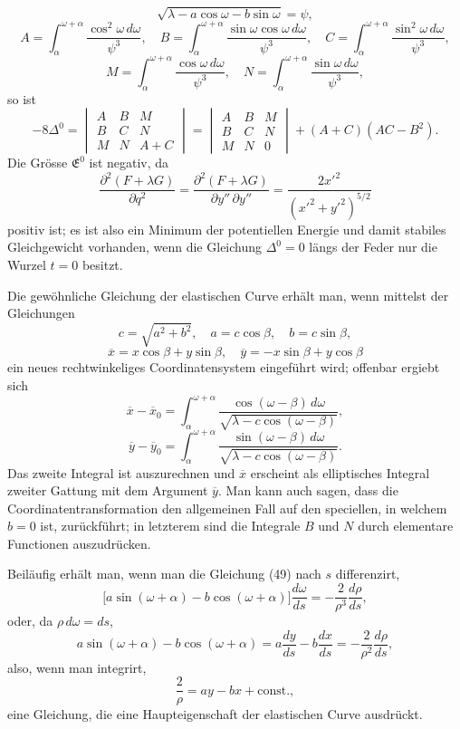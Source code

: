 \documentclass[11pt,a4paper,leqno]{article}
\begin{document}
\[
\sqrt{\lambda-a\cos\omega-b\sin\omega}=\psi,
\]
\[
A=\int_\alpha^{\omega+\alpha}\frac{\cos^2\omega\,d\omega}{\psi^3},\quad
B=\int_\alpha^{\omega+\alpha}\frac{\sin\omega\cos\omega\,d\omega}{\psi^3},\quad
C=\int_\alpha^{\omega+\alpha}\frac{\sin^2\omega\,d\omega}{\psi^3},
\]
\[
M=\int_\alpha^{\omega+\alpha}\frac{\cos\omega\,d\omega}{\psi^3},\quad
N=\int_\alpha^{\omega+\alpha}\frac{\sin\omega\,d\omega}{\psi^3},
\]
so ist
\[
-8\Delta^0=
\begin{vmatrix}
A&B&M\\
B&C&N\\
M&N&A+C
\end{vmatrix}
=
\begin{vmatrix}
A&B&M\\
B&C&N\\
M&N&0
\end{vmatrix}
+(A+C)(AC-B^2).
\]
Die Grösse $\mathfrak{E}^0$ ist negativ, da
\[
\frac{\partial^2(F+\lambda G)}{\partial q^2}
=\frac{\partial^2(F+\lambda G)}{\partial y''\,\partial y''}
=\frac{2x'^2}{(x'^2+y'^2)^{5/2}}
\]
positiv ist; es ist also ein Minimum der potentiellen Energie und damit stabiles Gleichgewicht vorhanden, wenn die Gleichung $\Delta^0=0$ längs der Feder nur die Wurzel $t=0$ besitzt.

Die gewöhnliche Gleichung der elastischen Curve erhält man, wenn mittelst der Gleichungen
\[
c=\sqrt{a^2+b^2},\quad a=c\cos\beta,\quad b=c\sin\beta,
\]
\[
\overline{x}=x\cos\beta+y\sin\beta,\quad
\overline{y}=-x\sin\beta+y\cos\beta
\]
ein neues rechtwinkeliges Coordinatensystem eingeführt wird; offenbar ergiebt sich
\[
\overline{x}-\overline{x}_0=
\int_\alpha^{\omega+\alpha}
\frac{\cos(\omega-\beta)\,d\omega}{\sqrt{\lambda-c\cos(\omega-\beta)}},
\]
\[
\overline{y}-\overline{y}_0=
\int_\alpha^{\omega+\alpha}
\frac{\sin(\omega-\beta)\,d\omega}{\sqrt{\lambda-c\cos(\omega-\beta)}}.
\]
Das zweite Integral ist auszurechnen und $\overline{x}$ erscheint als elliptisches Integral zweiter Gattung mit dem Argument $\overline{y}$. Man kann auch sagen, dass die Coordinatentransformation den allgemeinen Fall auf den speciellen, in welchem $b=0$ ist, zurückführt; in letzterem sind die Integrale $B$ und $N$ durch elementare Functionen auszudrücken.

Beiläufig erhält man, wenn man die Gleichung (49) nach $s$ differenzirt,
\[
\bigl[a\sin(\omega+\alpha)-b\cos(\omega+\alpha)\bigr]\frac{d\omega}{ds}
=-\frac2{\rho^3}\frac{d\rho}{ds},
\]
oder, da $\rho\,d\omega=ds$,
\[
a\sin(\omega+\alpha)-b\cos(\omega+\alpha)
=a\frac{dy}{ds}-b\frac{dx}{ds}
=-\frac2{\rho^2}\frac{d\rho}{ds},
\]
also, wenn man integrirt,
\[
\frac2{\rho}=ay-bx+\mathrm{const.},
\]
eine Gleichung, die eine Haupteigenschaft der elastischen Curve ausdrückt.
\end{document}
